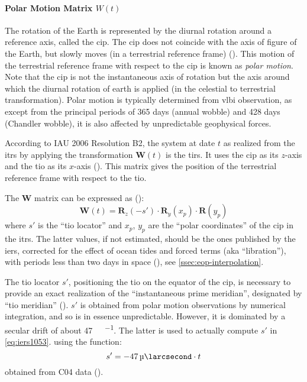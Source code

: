 \paragraph{Polar Motion Matrix $W(t)$}\label{par:polar-motion-matrix}
The rotation of the Earth is represented by the diurnal rotation around a
reference axis, called the \gls{cip}. The \gls{cip} does not coincide with 
the axis of figure of the Earth, but slowly moves (in a terrestrial reference 
frame) (\cite{Urban2013}). This motion of the terrestrial reference frame 
with respect to the \gls{cip} is known as \emph{polar motion}. Note that the 
\gls{cip} is not the instantaneous axis of rotation but the axis around which the 
diurnal rotation of earth is applied (in the celestial to terrestrial 
transformation). Polar motion is typically determined from \gls{vlbi} 
observation, as except from the principal periods of 365 days (annual wobble) 
and 428 days (Chandler wobble), it is also affected by unpredictable geophysical 
forces.

According to IAU 2006 Resolution B2, the system at date $t$ as realized 
from the \gls{itrs} by applying the transformation $\bm{W}(t)$ is the 
\gls{tirs}. It uses the \gls{cip} as its $z$-axis and the \gls{tio} as 
its $x$-axis (\cite{iers2010}). This matrix gives the position of the 
terrestrial reference frame with respect to the \gls{tio}.

The $\bm{W}$ matrix can be expressed as (\cite{iers2010}):
\begin{equation}
    \bm{W}(t) = \bm{R}_z(-s') \cdot \bm{R}_y(x_p) \cdot \bm{R}(y_p)
    \label{eq:iers1053}
\end{equation}
where $s'$ is the ``\gls{tio} locator'' and $x_p$, $y_p$ are the 
``polar coordinates'' of the \gls{cip} in the \gls{itrs}. The latter values, 
if not estimated, should be the ones published by the \gls{iers}, corrected for 
the effect of ocean tides and forced terms (aka ``libration''), with periods 
less than two days in space (\cite{iers2010}), see \autoref{ssec:eop-interpolation}.

The \gls{tio} locator $s'$, positioning the \gls{tio} on the equator of the \gls{cip}, 
is necessary to provide an exact realization of the ``instantaneous prime meridian'', 
designated by ``\gls{tio} meridian'' (\cite{iers2010}). $s'$ is obtained from 
polar motion observations by numerical integration, and so is in essence 
unpredictable. However, it is dominated by a secular drift of about 
\SI{47}{\micro\larcsecond\per\century}. The latter is used to actually compute 
$s'$ in \autoref{eq:iers1053}.
using the function:
\begin{equation}
  s' = \SI{-47}{\micro\larcsecond} \cdot t
  \label{eq:iers10513}
\end{equation}
obtained from C04 data (\cite{Lambert2002}).

